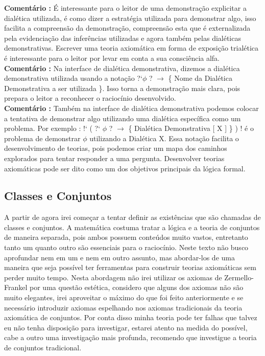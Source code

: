 \documentclass[10pt,a4paper]{report}
\begin{document}
\textbf{Comentário :} É interessante para o leitor de uma demonstração explicitar a dialética utilizada, é como dizer a estratégia utilizada para demonstrar algo, isso facilita a compreensão da demonstração, compreensão esta que é externalizada pela evidenciação das inferências utilizadas e agora também pelas dialéticas demonstrativas. Escrever uma teoria axiomática em forma de exposição trialética é interessante para o leitor por levar em conta a sua consciência alfa.\\

\textbf{Comentário :} Na interface de dialética demonstrativa, dizemos a dialética demonstrativa utilizada usando a notação ?`$ \phi $ ? $\rightarrow$ \{ Nome da Dialética Demonstrativa a ser utilizada \}. Isso torna a demonstração mais clara, pois prepara o leitor a reconhecer o raciocínio desenvolvido.\\

\textbf{Comentário :} Também na interface de dialética demonstrativa podemos colocar a tentativa de demonstrar algo utilizando uma dialética específica como um problema. Por exemplo : !` ( ?` $\phi$ ? $\rightarrow$ \{ Dialética Demonstrativa [ X ] \} ) ! é o problema de demonstrar $\phi$ utilizando a Dialética X. Essa notação facilita o desenvolvimento de teorias, pois podemos criar um mapa dos caminhos explorados para tentar responder a uma pergunta. Desenvolver teorias axiomáticas pode ser dito como um dos objetivos principais da lógica formal.

\subsection{Classes e Conjuntos}

\hspace{\baselineskip}

% 
A partir de agora irei começar a tentar definir as existências que são chamadas de classes e conjuntos. A matemática costuma tratar a lógica e a teoria de conjuntos de maneira separada, pois ambos possuem conteúdos muito vastos, entretanto tanto um quanto outro são essenciais para o raciocínio. Neste texto não busco aprofundar nem em um e nem em outro assunto, mas abordar-los de uma maneira que seja possível ter ferramentas para construir teorias axiomáticas sem perder muito tempo. Nesta abordagem não irei utilizar os axiomas de Zermello-Frankel por uma questão estética, considero que alguns dos axiomas não são muito elegantes, irei aproveitar o máximo do que foi feito anteriormente e se necessário introduzir axiomas espelhando nos axiomas tradicionais da teoria axiomática de conjuntos. Por conta disso minha teoria pode ter falhas que talvez eu não tenha disposição para investigar, estarei atento na medida do possível, cabe a outro uma investigação mais profunda, recomendo que investigue a teoria de conjuntos tradicional.
\end{document}
